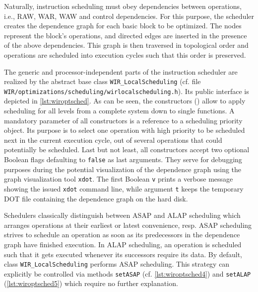 Naturally, instruction scheduling must obey dependencies between operations, i.e., \gls{RAW}, \gls{WAR}, \gls{WAW} and control dependencies.
For this purpose, the scheduler creates the dependence graph for each basic block to be optimized.
The nodes represent the block's operations, and directed edges are inserted in the presence of the above dependencies.
This graph is then traversed in topological order and operations are scheduled into execution cycles such that this order is preserved.

The generic and processor-independent parts of the instruction scheduler are realized by the abstract base class \texttt{WIR\_LocalScheduling} (cf. file \texttt{WIR/optimizations/scheduling/wirlocalscheduling.h}).
Its public interface is depicted in \cref{lst:wiroptsched}.
As can be seen, the constructors () allow to apply scheduling for all levels from a complete system down to single functions.
A mandatory parameter of all constructors is a reference to a scheduling priority object.
Its purpose is to select one operation with high priority to be scheduled next in the current execution cycle, out of several operations that could potentially be scheduled.
Last but not least, all constructors accept two optional Boolean flags defaulting to \texttt{false} as last arguments.
They serve for debugging purposes during the potential visualization of the dependence graph using the graph visualization tool \texttt{xdot}.
The first Boolean \texttt{v} prints a verbose message showing the issued \texttt{xdot} command line, while argument \texttt{t} keeps the temporary DOT file containing the dependence graph on the hard disk.

Schedulers classically distinguish between \gls{ASAP} and \gls{ALAP} scheduling which arranges operations at their earliest or latest convenience, resp.
\gls{ASAP} scheduling strives to schedule an operation as soon as its predecessors in the dependence graph have finished execution.
In \gls{ALAP} scheduling, an operation is scheduled such that it gets executed whenever its successors require its data.
By default, class \texttt{WIR\_LocalScheduling} performs \gls{ASAP} scheduling.
This strategy can explicitly be controlled via methods \texttt{setASAP} (cf. \cref{lst:wiroptsched4}) and \texttt{setALAP} (\cref{lst:wiroptsched5}) which require no further explanation.

